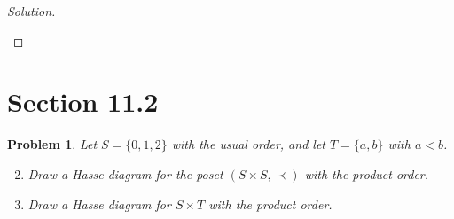 \documentclass[12pt]{article}
\newtheorem{problem}{Problem}
\begin{document}
\begin{proof}[Solution]
\begin{enumerate}[label=(\alph*)]
\begin{center}
    \end{center}
\end{enumerate}
\end{proof}

\section*{Section 11.2}

\setcounter{problem}{8}
\begin{problem}
Let $S = \{0, 1, 2\}$ with the usual order, and let $T = \{a, b\}$ with $a < b$.

\begin{enumerate}[label=(\alph*)]
    \setcounter{enumi}{1}
    \item Draw a Hasse diagram for the poset $(S \times S, \prec)$ with the product order.
    
    \item Draw a Hasse diagram for $S \times T$ with the product order.
\end{enumerate}
\end{problem}
\end{document}
